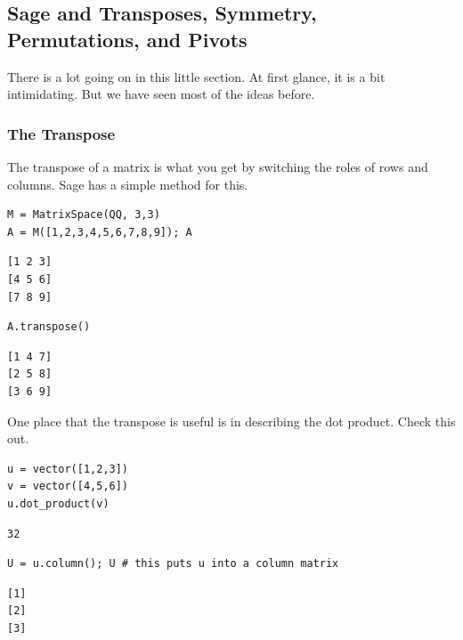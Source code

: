 \documentclass[10pt,]{book}
\theoremstyle{plain}
\theoremstyle{definition}
\numberwithin{equation}{section}
\begin{document}
\subsection[Sage and Transposes, Symmetry, Permutations, and Pivots]{Sage and Transposes, Symmetry, Permutations, and Pivots}\label{subsection-54}

      There is a lot going on in this little section. At first glance, it is a
      bit intimidating. But we have seen most of the ideas before.
\typeout{************************************************}
\typeout{************************************************}
\subsubsection[The Transpose]{The Transpose}\label{subsubsection-32}

        The transpose of a matrix is what you get by switching the roles of rows
        and columns. Sage has a simple method for this.
\begin{lstlisting}[style=sageinput]
M = MatrixSpace(QQ, 3,3)
A = M([1,2,3,4,5,6,7,8,9]); A
\end{lstlisting}
\begin{lstlisting}[style=sageoutput]
[1 2 3]
[4 5 6]
[7 8 9]
\end{lstlisting}
\begin{lstlisting}[style=sageinput]
A.transpose()
\end{lstlisting}
\begin{lstlisting}[style=sageoutput]
[1 4 7]
[2 5 8]
[3 6 9]
\end{lstlisting}
\par

        One place that the transpose is useful is in describing the dot product.
        Check this out.
\begin{lstlisting}[style=sageinput]
u = vector([1,2,3])
v = vector([4,5,6])
u.dot_product(v)
\end{lstlisting}
\begin{lstlisting}[style=sageoutput]
32
\end{lstlisting}
\begin{lstlisting}[style=sageinput]
U = u.column(); U # this puts u into a column matrix
\end{lstlisting}
\begin{lstlisting}[style=sageoutput]
[1]
[2]
[3]
\end{lstlisting}
\par
\end{document}
